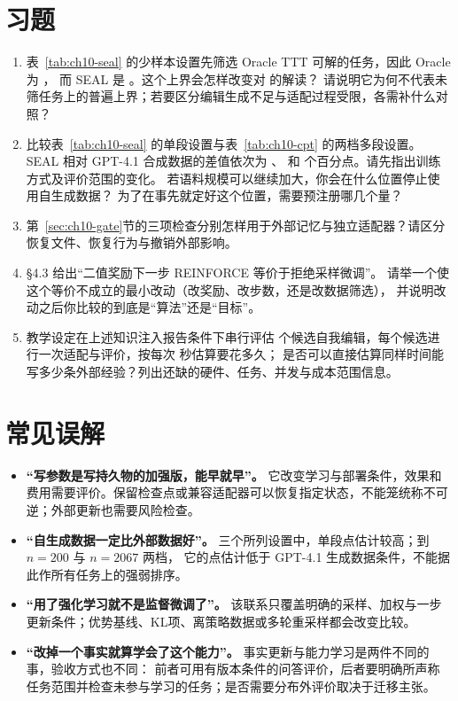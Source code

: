 \section*{习题}
\begin{enumerate}[label=10-\arabic*.,ref=10-\arabic*]
  \item\label{ex:ch10-1} 表~\ref{tab:ch10-seal} 的少样本设置先筛选 Oracle TTT 可解的任务，因此 Oracle 为 ，
        而 SEAL 是 。这个上界会怎样改变对  的解读？
        请说明它为何不代表未筛任务上的普遍上界；若要区分编辑生成不足与适配过程受限，各需补什么对照？
  \item\label{ex:ch10-2} 比较表~\ref{tab:ch10-seal} 的单段设置与表~\ref{tab:ch10-cpt} 的两档多段设置。SEAL 相对 GPT-4.1 合成数据的差值依次为 、 和  个百分点。请先指出训练方式及评价范围的变化。
        若语料规模可以继续加大，你会在什么位置停止使用自生成数据？
        为了在事先就定好这个位置，需要预注册哪几个量？
  \item\label{ex:ch10-3} 第~\ref{sec:ch10-gate}节的三项检查分别怎样用于外部记忆与独立适配器？请区分恢复文件、恢复行为与撤销外部影响。
  \item\label{ex:ch10-4} \cite{self-challenging-2506} §4.3 给出“二值奖励下一步 REINFORCE 等价于拒绝采样微调”。
        请举一个使这个等价不成立的最小改动（改奖励、改步数，还是改数据筛选），
        并说明改动之后你比较的到底是“算法”还是“目标”。
  \item\label{ex:ch10-5} 教学设定在上述知识注入报告条件下串行评估  个候选自我编辑，每个候选进行一次适配与评价，按每次  秒估算要花多久；
        是否可以直接估算同样时间能写多少条外部经验？列出还缺的硬件、任务、并发与成本范围信息。
\end{enumerate}

\section*{常见误解}
\begin{itemize}
  \item \textbf{“写参数是写持久物的加强版，能早就早”。}
        它改变学习与部署条件，效果和费用需要评价。保留检查点或兼容适配器可以恢复指定状态，不能笼统称不可逆；外部更新也需要风险检查。
  \item \textbf{“自生成数据一定比外部数据好”。}
        三个所列设置中，单段点估计较高；到 $n=200$ 与 $n=2067$ 两档，
        它的点估计低于 GPT-4.1 生成数据条件，不能据此作所有任务上的强弱排序。
  \item \textbf{“用了强化学习就不是监督微调了”。}
        该联系只覆盖明确的采样、加权与一步更新条件；优势基线、KL项、离策略数据或多轮重采样都会改变比较。
  \item \textbf{“改掉一个事实就算学会了这个能力”。}
        事实更新与能力学习是两件不同的事，验收方式也不同：
        前者可用有版本条件的问答评价，后者要明确所声称任务范围并检查未参与学习的任务；是否需要分布外评价取决于迁移主张。
\end{itemize}

